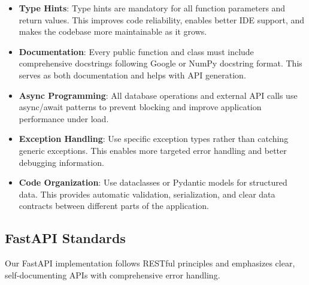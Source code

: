 \documentclass[12pt]{article}
\begin{document}
\begin{itemize}
    \item \textbf{Type Hints}: Type hints are mandatory for all function parameters and return values. This improves code reliability, enables better IDE support, and makes the codebase more maintainable as it grows.
    
    \item \textbf{Documentation}: Every public function and class must include comprehensive docstrings following Google or NumPy docstring format. This serves as both documentation and helps with API generation.
    
    \item \textbf{Async Programming}: All database operations and external API calls use async/await patterns to prevent blocking and improve application performance under load.
    
    \item \textbf{Exception Handling}: Use specific exception types rather than catching generic exceptions. This enables more targeted error handling and better debugging information.
    
    \item \textbf{Code Organization}: Use dataclasses or Pydantic models for structured data. This provides automatic validation, serialization, and clear data contracts between different parts of the application.
\end{itemize}

\subsection{FastAPI Standards}
Our FastAPI implementation follows RESTful principles and emphasizes clear, self-documenting APIs with comprehensive error handling.
\end{document}
